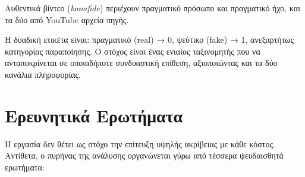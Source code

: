 Αυθεντικά βίντεο (\emph{bonafide}) περιέχουν πραγματικό πρόσωπο και
πραγματικό ήχο, και τα δύο από YouTube αρχεία πηγής.

Η δυαδική ετικέτα είναι: πραγματικό (real) → 0, ψεύτικο (fake) → 1,
ανεξαρτήτως κατηγορίας παραποίησης.
Ο στόχος είναι ένας ενιαίος ταξινομητής που να ανταποκρίνεται
σε οποιαδήποτε συνδυαστική επίθεση, αξιοποιώντας και τα δύο
κανάλια πληροφορίας.

\section{Ερευνητικά Ερωτήματα}

Η εργασία δεν θέτει ως στόχο την επίτευξη υψηλής ακρίβειας
με κάθε κόστος. Αντίθετα, ο πυρήνας της ανάλυσης οργανώνεται γύρω
από τέσσερα ψευδαισθητά ερωτήματα:


